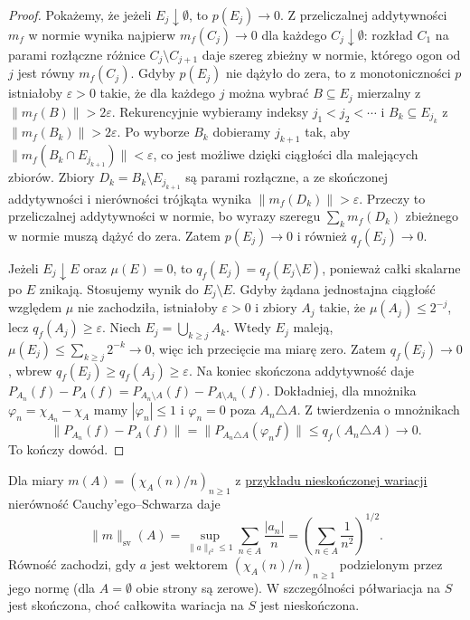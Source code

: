 \begin{proof}
Pokażemy, że jeżeli $E_j\downarrow\emptyset$, to
$p(E_j)\to0$. Z przeliczalnej addytywności $m_f$ w normie
wynika najpierw $m_f(C_j)\to0$ dla każdego
$C_j\downarrow\emptyset$: rozkład $C_1$ na parami
rozłączne różnice $C_j\setminus C_{j+1}$ daje szereg
zbieżny w normie, którego ogon od $j$ jest równy $m_f(C_j)$.
Gdyby $p(E_j)$ nie dążyło do zera, to z monotoniczności
$p$ istniałoby $\varepsilon>0$ takie, że dla każdego $j$
można wybrać $B\subseteq E_j$ mierzalny z $\|m_f(B)\|>2\varepsilon$.
Rekurencyjnie wybieramy indeksy $j_1<j_2<\cdots$ i
$B_k\subseteq E_{j_k}$ z $\|m_f(B_k)\|>2\varepsilon$.
Po wyborze $B_k$ dobieramy $j_{k+1}$ tak, aby
$\|m_f(B_k\cap E_{j_{k+1}})\|<\varepsilon$, co jest
możliwe dzięki ciągłości dla malejących zbiorów.
Zbiory $D_k=B_k\setminus E_{j_{k+1}}$ są parami rozłączne,
a ze skończonej addytywności i nierówności trójkąta
wynika $\|m_f(D_k)\|>\varepsilon$. Przeczy to
przeliczalnej addytywności w normie, bo wyrazy szeregu
$\sum_km_f(D_k)$ zbieżnego w normie muszą dążyć do zera.
Zatem $p(E_j)\to0$ i również $q_f(E_j)\to0$.

Jeżeli $E_j\downarrow E$ oraz $\mu(E)=0$, to
$q_f(E_j)=q_f(E_j\setminus E)$, ponieważ całki skalarne
po $E$ znikają. Stosujemy wynik do $E_j\setminus E$.
Gdyby żądana jednostajna ciągłość względem $\mu$ nie
zachodziła, istniałoby $\varepsilon>0$ i zbiory $A_j$
takie, że $\mu(A_j)\le2^{-j}$, lecz $q_f(A_j)\ge\varepsilon$.
Niech $E_j=\bigcup_{k\ge j}A_k$. Wtedy $E_j$ maleją,
$\mu(E_j)\le\sum_{k\ge j}2^{-k}\to0$, więc ich
przecięcie ma miarę zero. Zatem $q_f(E_j)\to0$,
wbrew $q_f(E_j)\ge q_f(A_j)\ge\varepsilon$.
Na koniec skończona addytywność daje
$P_{A_n}(f)-P_A(f)=P_{A_n\setminus A}(f)-P_{A\setminus A_n}(f)$.
Dokładniej, dla mnożnika $\varphi_n=\chi_{A_n}-\chi_A$
mamy $|\varphi_n|\le1$ i $\varphi_n=0$ poza
$A_n\triangle A$. Z twierdzenia o mnożnikach
\[
 \|P_{A_n}(f)-P_A(f)\|
 =\|P_{A_n\triangle A}(\varphi_n f)\|
 \le q_f(A_n\triangle A)\longrightarrow0.
\]
To kończy dowód.
\end{proof}

\begin{uwaga}
Dla miary $m(A)=(\chi_A(n)/n)_{n\ge1}$ z
\hyperref[ex:pettis-infinite-variation15b]{przykładu nieskończonej wariacji}
nierówność Cauchy'ego--Schwarza daje
\[
 \|m\|_{\mathrm{sv}}(A)
 =\sup_{\|a\|_{\ell^2}\le1}\sum_{n\in A}\frac{|a_n|}{n}
 =\left(\sum_{n\in A}\frac1{n^2}\right)^{1/2}.
\]
Równość zachodzi, gdy $a$ jest wektorem
$(\chi_A(n)/n)_{n\ge1}$ podzielonym przez jego normę
(dla $A=\emptyset$ obie strony są zerowe). W szczególności
półwariacja na $S$ jest skończona, choć całkowita wariacja
na $S$ jest nieskończona.
\end{uwaga}

